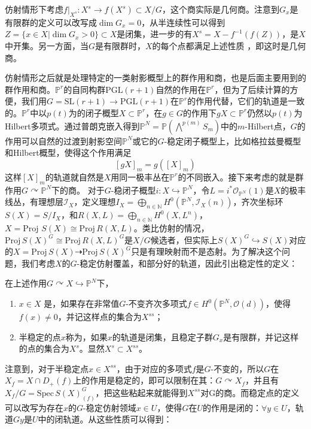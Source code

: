 仿射情形下考虑$ f|_{X^s}:X^s \to f(X^s)\subset X/G $，这个商实际是几何商。注意到$ G_x $是有限群的定义可以改写成$ \dim G_x=0 $，从半连续性可以得到$ Z=\{x\in X| \dim G_x>0\}\subset X $是闭集，进一步的有$ X^s=X-f^{-1}(f(Z)) $，是$ X $中开集。另一方面，当$ G $是有限群时，$ X $的每个点都满足上述性质 ，即这时是几何商。

仿射情形之后就是处理特定的一类射影概型上的群作用和商，也是后面主要用到的群作用和商。$ \mathbb{P}^r $的自同构群$ \mathrm{PGL}(r+1) $自然的作用在$ \mathbb{P}^r $，但为了后续计算的方便，我们用$ G=\mathrm{SL}(r+1)\to \mathrm{PGL}(r+1) $在$ \mathbb{P}^r $的作用代替，它们的轨道是一致的。$ \mathbb{P}^r $中以$ p(t) $为的闭子概型$ X \subset \mathbb{P}^r$，在$ g\in G $的作用下$ gX\subset \mathbb{P}^r $仍然以$ p(t) $为Hilbert多项式。通过普朗克嵌入得到$ \mathbb{P}^N=\mathbb{P}(\bigwedge^{p(m)}S_m) $中的$ m $-Hilbert点，$ G $的作用可以自然的过渡到射影空间$ \mathbb{P}^N $或它的$ G $-稳定闭子概型上，比如格拉兹曼概型和Hilbert概型，使得这个作用满足
$$ [gX]_m=g([X]_m) $$
这样$ [X]_m $的轨道就自然是$ X $用同一极丰丛在$ \mathbb{P}^r $的不同嵌入。接下来考虑的就是群作用$ G\curvearrowright \mathbb{P}^N $下的商。
对于$ G $-稳闭子概型$ i:X\hookrightarrow \mathbb{P}^N$，令$ L=i^*\mathscr{O}_{\mathbb{P}^N}(1) $是$ X $的极丰线丛，有理想层$ \mathscr{I}_X $，定义理想$ I_X=\bigoplus_{n\in \mathbb{N}}H^0(\mathbb{P}^N,\mathscr{I}_X(n)) $，齐次坐标环$ S(X)=S/I_X $，和$ R(X,L)=\bigoplus_{n\in \mathbb{N}}H^0(X,L^n) $，$ X=\mathrm{Proj} \, \,S(X) \cong \mathrm{Proj} \, R(X,L) $。类比仿射的情况，$ \mathrm{Proj} \,S(X)^G \cong \mathrm{Proj} \,R(X,L)^G $是$ X/G $候选者，但实际上$ S(X)^G\hookrightarrow S(X) $对应的$ X=\mathrm{Proj} \,S(X)\dashrightarrow \mathrm{Proj} \,S(X)^G $只是有理映射而不是态射。为了解决这个问题，我们考虑$ X $的$ G $-稳定仿射覆盖，和部分好的轨道，因此引出稳定性的定义：
\begin{definition}
	在上述作用$ G\curvearrowright X\hookrightarrow \mathbb{P}^N $下，
	\begin{enumerate}
		\item $ x\in X $ 是，如果存在非常值$ G $-不变齐次多项式$ f\in H^0(\mathbb{P}^N,\mathscr{O}(d)) $，使得$ f(x)\neq 0 $，并记这样点的集合为$ X^{ss} $；
		\item 半稳定的点$ x $称为，如果$ x $的轨道是闭集，且稳定子群$ G_x $是有限群，并记这样的点的集合为$ X^s $。显然$ X^s\subset X^{ss} $。
	\end{enumerate}
\end{definition}
注意到，对于半稳定点$ x\in X^{ss} $，由于对应的多项式$ f $是$ G $-不变的，所以$ G $在$ X_f=X\cap D_+(f) $上的作用是稳定的，即可以限制在其：$ G\curvearrowright X_f $，并且有$ X_f/G=\mathrm{Spec}\,S(X) _{(f)}^G$，把这些粘起来就能得到$ X^{ss} $对G的商。而稳定点的定义可以改写为存在$ x $的$ G $-稳定仿射领域$ x\in U $，使得$ G $在$ U $的作用是闭的：$ \forall y\in U $，轨道$ Gy $是$ U $中的闭轨道。从这些性质可以得到：
